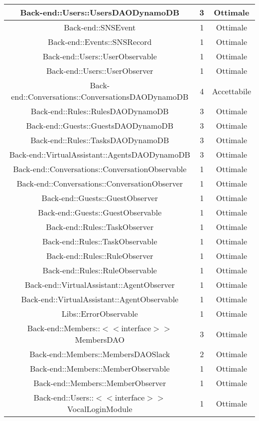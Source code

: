 \begin{longtable}{|c|c|c|}
\hline Back-end::Users::UsersDAODynamoDB & 3 & Ottimale \\
\hline Back-end::SNSEvent & 1 & Ottimale \\
\hline Back-end::Events::SNSRecord & 1 & Ottimale \\
\hline Back-end::Users::UserObservable & 1 & Ottimale \\
\hline Back-end::Users::UserObserver & 1 & Ottimale \\
\hline Back-end::Conversations::ConversationsDAODynamoDB & 4 & Accettabile \\
\hline Back-end::Rules::RulesDAODynamoDB & 3 & Ottimale \\
\hline Back-end::Guests::GuestsDAODynamoDB & 3 & Ottimale \\
\hline Back-end::Rules::TasksDAODynamoDB & 3 & Ottimale \\
\hline Back-end::VirtualAssistant::AgentsDAODynamoDB & 3 & Ottimale \\
\hline Back-end::Conversations::ConversationObservable & 1 & Ottimale \\
\hline Back-end::Conversations::ConversationObserver & 1 & Ottimale \\
\hline Back-end::Guests::GuestObserver & 1 & Ottimale \\
\hline Back-end::Guests::GuestObservable & 1 & Ottimale \\
\hline Back-end::Rules::TaskObserver & 1 & Ottimale \\
\hline Back-end::Rules::TaskObservable & 1 & Ottimale \\
\hline Back-end::Rules::RuleObserver & 1 & Ottimale \\
\hline Back-end::Rules::RuleObservable & 1 & Ottimale \\
\hline Back-end::VirtualAssistant::AgentObserver & 1 & Ottimale \\
\hline Back-end::VirtualAssistant::AgentObservable & 1 & Ottimale \\
\hline Libs::ErrorObservable & 1 & Ottimale \\
\hline Back-end::Members::$<$$<$interface$>$$>$ MembersDAO & 3 & Ottimale \\
\hline Back-end::Members::MembersDAOSlack & 2 & Ottimale \\
\hline Back-end::Members::MemberObservable & 1 & Ottimale \\
\hline Back-end::Members::MemberObserver & 1 & Ottimale \\
\hline Back-end::Users::$<$$<$interface$>$$>$VocalLoginModule & 1 & Ottimale \\

\end{longtable}
